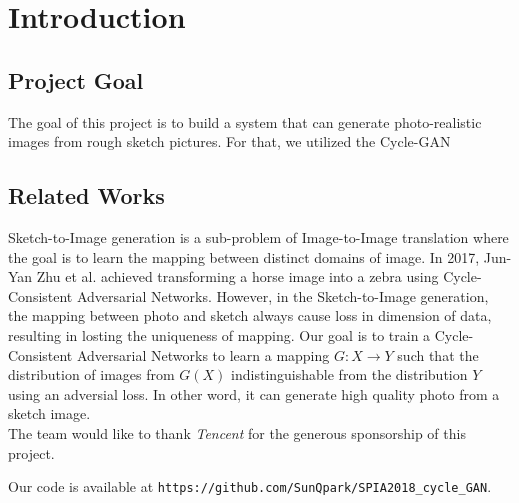 \chapter{Introduction}\label{Ch:Introduction}

\section{Project Goal}

The goal of this project is to build a system that can generate photo-realistic images from rough sketch pictures. For that, we utilized the Cycle-GAN~\cite{CycleGAN}

\section{Related Works}

Sketch-to-Image generation is a sub-problem of Image-to-Image translation where the goal is to 
learn the mapping between distinct domains of image. 
In 2017, Jun-Yan Zhu et al. achieved transforming a horse image into a zebra using Cycle-Consistent Adversarial Networks. However, in the Sketch-to-Image generation, the mapping between photo and sketch always cause loss in dimension of data, resulting in losting the uniqueness of mapping. Our goal is to train a Cycle-Consistent Adversarial Networks to learn a mapping \(G:X \rightarrow Y\) such that the distribution of images from \(G(X)\) indistinguishable from the distribution \(Y\) using an adversial loss. In other word, it can generate high quality photo from a sketch image.\\%


The team would like to thank \emph{Tencent} for the generous sponsorship of this project. 



Our code is available at \texttt{https://github.com/SunQpark/SPIA2018\_cycle\_GAN}.




\endinput

